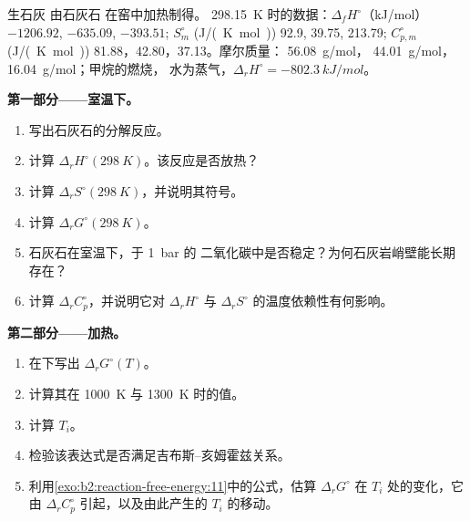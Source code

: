 \begin{problem}
\label{pb:b2:reaction-free-energy:1}
生石灰  由石灰石  在窑中加热制得。
\qty{298.15}{K} 时的数据：$\Delta_f H^\circ$（\unit{kJ/mol}）
$-1206.92$,  $-635.09$,  $-393.51$; $S^\circ_m$
(\unit{J/(K.mol)}) 92.9, 39.75, 213.79; $C^\circ_{p,m}$ (\unit{J/(K.mol)})
81.88，42.80，37.13。摩尔质量： \qty{56.08}{g/mol}，
\qty{44.01}{g/mol}， \qty{16.04}{g/mol}；甲烷的燃烧，
水为蒸气，$\Delta_r H^\circ = \qty{-802.3}{kJ/mol}$。

\medskip
\noindent\textbf{第一部分——室温下。}
\begin{enumerate}
  \item 写出石灰石的分解反应。
  \item 计算 $\Delta_r H^\circ(\qty{298}{K})$。该反应是否放热？
  \item 计算 $\Delta_r S^\circ(\qty{298}{K})$，并说明其符号。
  \item 计算 $\Delta_r G^\circ(\qty{298}{K})$。
  \item 石灰石在室温下，于 \qty{1}{bar} 的
        二氧化碳中是否稳定？为何石灰岩峭壁能长期存在？
  \item 计算 $\Delta_r C^\circ_p$，并说明它对
        $\Delta_r H^\circ$ 与 $\Delta_r S^\circ$ 的温度依赖性有何影响。
\end{enumerate}

\medskip
\noindent\textbf{第二部分——加热。}
\begin{enumerate}[resume]
  \item 在下写出 $\Delta_r G^\circ(T)$。
  \item 计算其在 \qty{1000}{K} 与 \qty{1300}{K} 时的值。
  \item 计算 $T_i$。
  \item 检验该表达式是否满足吉布斯–亥姆霍兹关系。
  \item 利用\cref{exo:b2:reaction-free-energy:11}中的公式，估算
        $\Delta_r G^\circ$ 在 $T_i$ 处的变化，它由
        $\Delta_r C^\circ_p$ 引起，以及由此产生的 $T_i$ 的移动。
\end{enumerate}


\end{problem}
